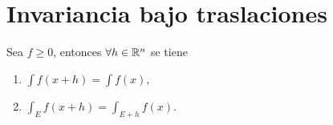                     \section{ Invariancia bajo traslaciones }
                    
                    \begin{teorema}
                Sea $f\geq 0$, entonces $\forall h \in \mathbb{R}^n$ se tiene
                \begin{enumerate}
                    \item \label{it:invariancia-f-x+h} $\int f(x+h) =\int f(x)$,
                    \item \label{it:invariancia-f-y-E-x+h} $\int_E f(x+h) =\int_{E+h} f(x)$.
                \end{enumerate}
                    \end{teorema}
                    
